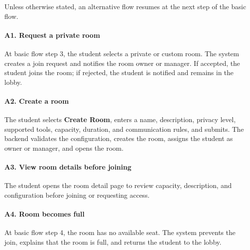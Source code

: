 \documentclass[12pt]{article}
\begin{document}
Unless otherwise stated, an alternative flow resumes at the next step of the basic flow.
\par\medskip

\hypertarget{sec:a1-request-a-private-room}{}
\paragraph*{A1. Request a private room}
\par\medskip

At basic flow step 3, the student selects a private or custom room. The system creates a join request and notifies the room owner or manager. If accepted, the student joins the room; if rejected, the student is notified and remains in the lobby.
\par\medskip

\hypertarget{sec:a2-create-a-room}{}
\paragraph*{A2. Create a room}
\par\medskip

The student selects \textbf{Create Room}, enters a name, description, privacy level, supported tools, capacity, duration, and communication rules, and submits. The backend validates the configuration, creates the room, assigns the student as owner or manager, and opens the room.
\par\medskip

\hypertarget{sec:a3-view-room-details-before-joining}{}
\paragraph*{A3. View room details before joining}
\par\medskip

The student opens the room detail page to review capacity, description, and configuration before joining or requesting access.
\par\medskip

\hypertarget{sec:a4-room-becomes-full}{}
\paragraph*{A4. Room becomes full}
\par\medskip

At basic flow step 4, the room has no available seat. The system prevents the join, explains that the room is full, and returns the student to the lobby.
\par\medskip
\end{document}

